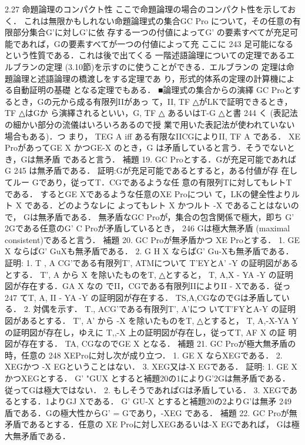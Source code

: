 \documentclass{ltjsarticle}
\theoremstyle{mystyle1}
\theoremstyle{mystyle3}
\theoremstyle{mystyle2}
\begin{document}
2.27 命題論理のコンパクト性 ここで命題論理の場合のコンパクト性を示しておく． これは無限かもしれない命題論理式の集合GC Pro について，その任意の有限部分集合G'に対しG'に依 存する一つの付値によってG' の要素すべてが充足可 能であれば，Gの要素すべてが一つの付値によって充
ここに
243
足可能になるという性質である．これは後で出てくる 一階述語論理についての定理であるエルブランの定理 (3.10節)を示すのに使うことができる．エルブランの 定理は命題論理と述語論理の橋渡しをする定理であ
り，形式的体系の定理の計算機による自動証明の基礎 となる定理でもある．
■論理式の集合からの演繹
GC Proとするとき，Gの元から成る有限列IIがあっ て，II, TF △がLKで証明できるとき，TF △はGか ら演繹されるといい，G, TF △ あるいはT-G △と書
244
く (表記法の細かい部分の流儀はいろいろあるので授 業で用いた表記法が使われていない場合もある)．つ まり，
TEG A iff ある有限なIICGによりII, TF A
である． XE ProがあってGE X かつGE-X のとき，G は矛盾していると言う．そうでないとき，Gは無矛盾 であると言う．
補題 19. GC Proとする．Gが充足可能であればG
245
は無矛盾である．
証明:Gが充足可能であるとすると，ある付値が存 在してルー Gであり，従ってT．CGであるような任 意の有限列Tに対してもレトT である． するとGE Xであるような任意のXE Proについ
て，LKの健全性よりルト X である．どのようなレに よってもレト X かつルト -X であることはないので， Gは無矛盾である．
無矛盾なGC Proが，集合の包含関係で極大，即ち G' 2Gである任意のG' C Proが矛盾しているとき，
246
Gは極大無矛盾 (maximal consistent)であると言う．
補題 20. GC Proが無矛盾かつ XE Proとする． 1. GE X ならばG' Gu{X}も無矛盾である． 2. G H X ならばG' Gu{-X}も無矛盾である．
証明: 1. T , A CG'である有限列T', ATMについて T'EYとA' -Y の証明図があるとする． T', A から X を除いたものをT, △とすると， T, A,X - YA -Y の証明図が存在する．GA X なの でII，CGである有限列IIによりII - Xである．従っ
247
てT, A, II - YA -Y の証明図が存在する． TS,A,CGなのでGは矛盾している． 2. 対偶を示す． T., ACG'である有限列T', A'につ いてT'FYとA-Y の証明図があるとする． T', A' から -X を除いたものをT, △とすると， T, A,-X-YA Y の証明図が存在し，ゆえに T,,-X 上の証明図が存在し，従ってT, AF X の証 明図が存在する． TA, CGなのでGE X となる．
補題 21. GC Proが極大無矛盾の時，任意の
248
XEProに対し次が成り立つ． 1. GE X ならXEGである． 2. XEGかつ -X EGということはない． 3. XEG又は-X EGである．
証明: 1. GE X かつXEGとする． G' "GU{X} とすると補題20の1によりG'2Gは無矛盾である． 従ってGは極大ではない． 2. もしそうであればGは矛盾している． 3. XEGであるとする．1よりGJ Xである． G' GU{-X} とすると補題20の2よりG'は無矛
249
盾である．Gの極大性からG' = Gであり，-XEG である．
補題 22. GC Proが無矛盾であるとする．任意の XE Proに対しXEGあるいは-X EGであれば， Gは極大無矛盾である．
\end{document}
